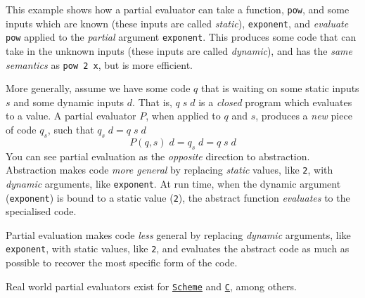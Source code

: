 This example shows how a partial evaluator can take a function, \texttt{pow}, and some inputs which are known (these inputs are called \textit{static}), \texttt{exponent}, and \textit{evaluate} \texttt{pow} applied to the \textit{partial} argument \texttt{exponent}. This produces some code that can take in the unknown inputs (these inputs are called \textit{dynamic}), and has the \textit{same semantics} as \texttt{pow 2 x}, but is more efficient. 

More generally, assume we have some code $q$ that is waiting on some static inputs $s$ and some dynamic inputs $d$. That is, $q \; s \; d$ is a \textit{closed} program which evaluates to a value. A partial evaluator $P$, when applied to $q$ and $s$, produces a \textit{new} piece of code $q_s$, such that $q_s \; d = q \; s \; d$
\[P(q, s) \;  d = q_s \; d = q \; s \; d\]
You can see partial evaluation as the \textit{opposite} direction to abstraction. Abstraction makes code \textit{more general} by replacing \textit{static} values, like \texttt{2}, with \textit{dynamic} arguments, like \texttt{exponent}. At run time, when the dynamic argument (\texttt{exponent}) is bound to a static value (\texttt{2}), the abstract function \textit{evaluates} to the specialised code. 

Partial evaluation makes code \textit{less} general by replacing \textit{dynamic} arguments, like \texttt{exponent}, with static values, like \texttt{2}, and evaluates the abstract code as much as possible to recover the most specific form of the code.

Real world partial evaluators exist for \href{https://www.cs.cmu.edu/afs/cs/project/ai-repository/ai/lang/scheme/impl/similix/0.html}{\texttt{Scheme}} and \href{http://phoenix.inria.fr/software/past-projects/tempo.html}{\texttt{C}}, among others.

